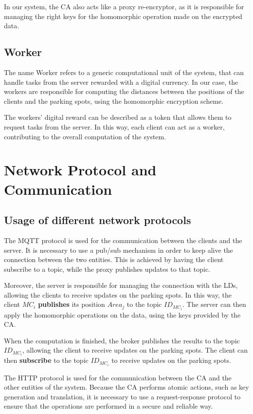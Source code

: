 In our system, the CA also acts like a proxy re-encryptor\cite{POLYAKOV2017FastPRE}, as it is responsible for managing the right keys for the homomorphic operation made on the encrypted data. 

\subsection{Worker}
The name Worker refers to a generic computational unit of the system, that can handle tasks from the server rewarded with a digital currency. In our case, the workers are responsible for computing the distances between the positions of the clients and the parking spots, using the homomorphic encryption scheme. 

The workers' digital reward can be described as a token that allows them to request tasks from the server. In this way, each client can act as a worker, contributing to the overall computation of the system.

\section{Network Protocol and Communication}
\subsection{Usage of different network protocols}

The MQTT protocol is used for the communication between the clients and the server. It is necessary to use a pub/sub mechanism in order to keep alive the connection between the two entities. This is achieved by having the client subscribe to a topic, while the proxy publishes updates to that topic.

Moreover, the server is responsible for managing the connection with the LDs, allowing the clients to receive updates on the parking spots. In this way, the client $MC_i$ \textbf{publishes} its position $Area_j$ to the topic $ID_{MC_i}$. The server can then apply the homomorphic operations on the data, using the keys provided by the CA.

When the computation is finished, the broker publishes the results to the topic $ID_{MC_i}$, allowing the client to receive updates on the parking spots. The client can then \textbf{subscribe} to the topic $ID_{MC_i}$ to receive updates on the parking spots.

The HTTP protocol is used for the communication between the CA and the other entities of the system. Because the CA performs atomic actions, such as key generation and translation, it is necessary to use a request-response protocol to ensure that the operations are performed in a secure and reliable way.

